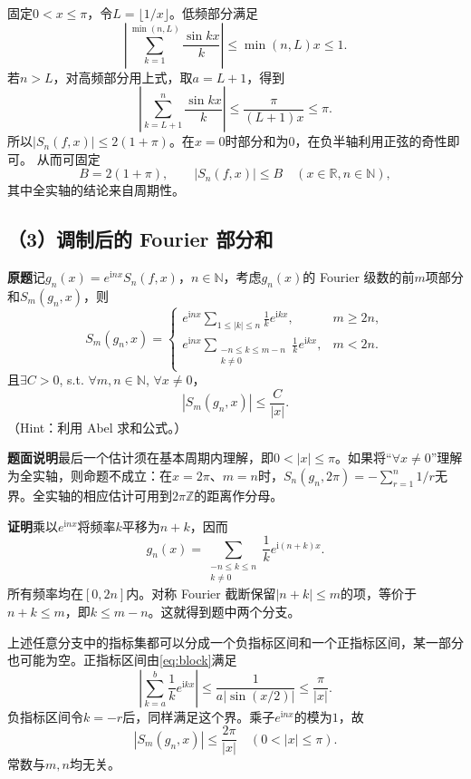 \documentclass[11pt,a4paper]{ctexart}
\newcommand{\N}{\mathbb N}
\newcommand{\R}{\mathbb R}
\newcommand{\ii}{\mathrm i}
\newcommand{\proofstart}{\par\noindent\textbf{证明}\quad}
\begin{document}
固定$0<x\le\pi$，令$L=\lfloor1/x\rfloor$。低频部分满足
\[
 \left|\sum_{k=1}^{\min(n,L)}\frac{\sin kx}{k}\right|
 \le\min(n,L)x\le1.
\]
若$n>L$，对高频部分用上式，取$a=L+1$，得到
\[
 \left|\sum_{k=L+1}^{n}\frac{\sin kx}{k}\right|
 \le\frac\pi{(L+1)x}\le\pi.
\]
所以$|S_n(f,x)|\le2(1+\pi)$。在$x=0$时部分和为$0$，在负半轴利用正弦的奇性即可。
从而可固定
\begin{equation}\label{eq:B}
 B=2(1+\pi),\qquad |S_n(f,x)|\le B\quad(x\in\R,n\in\N),
\end{equation}
其中全实轴的结论来自周期性。

\subsection*{（3）调制后的 Fourier 部分和}
\noindent\textbf{原题}\quad 记$g_n(x)=e^{\ii nx}S_n(f,x)$，$n\in\N$，考虑$g_n(x)$的 Fourier 级数的前$m$项部分和$S_m(g_n,x)$，则
\[
 S_m(g_n,x)=
 \begin{cases}
 e^{\ii nx}\displaystyle\sum_{1\le|k|\le n}\frac1k e^{\ii kx},&m\ge2n,\\[4pt]
 e^{\ii nx}\displaystyle\sum_{\substack{-n\le k\le m-n\\k\ne0}}\frac1k e^{\ii kx},&m<2n.
 \end{cases}
\]
且$\exists C>0$, s.t. $\forall m,n\in\N$, $\forall x\ne0$，
\[
 |S_m(g_n,x)|\le\frac C{|x|}.
\]
（Hint：利用 Abel 求和公式。）

\noindent\textbf{题面说明}\quad 最后一个估计须在基本周期内理解，即$0<|x|\le\pi$。如果将“$\forall x\ne0$”理解为全实轴，则命题不成立：在$x=2\pi$、$m=n$时，$S_n(g_n,2\pi)=-\sum_{r=1}^{n}1/r$无界。全实轴的相应估计可用到$2\pi\mathbb Z$的距离作分母。

\proofstart 乘以$e^{\ii nx}$将频率$k$平移为$n+k$，因而
\[
 g_n(x)=\sum_{\substack{-n\le k\le n\\k\ne0}}\frac1k e^{\ii(n+k)x}.
\]
所有频率均在$[0,2n]$内。对称 Fourier 截断保留$|n+k|\le m$的项，等价于$n+k\le m$，即$k\le m-n$。这就得到题中两个分支。

上述任意分支中的指标集都可以分成一个负指标区间和一个正指标区间，某一部分也可能为空。正指标区间由\eqref{eq:block}满足
\[
 \left|\sum_{k=a}^{b}\frac1k e^{\ii kx}\right|
 \le\frac1{a|\sin(x/2)|}\le\frac\pi{|x|}.
\]
负指标区间令$k=-r$后，同样满足这个界。乘子$e^{\ii nx}$的模为$1$，故
\begin{equation}\label{eq:Sm}
 \boxed{\displaystyle |S_m(g_n,x)|\le\frac{2\pi}{|x|}
 \quad(0<|x|\le\pi).}
\end{equation}
常数与$m,n$均无关。
\end{document}
